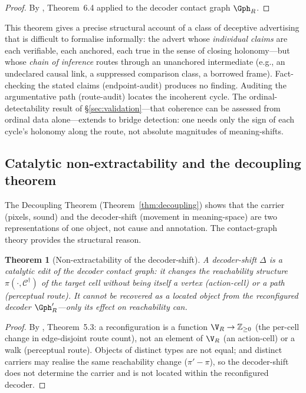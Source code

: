 \documentclass[twocolumn,11pt,a4paper]{article}
\theoremstyle{adv}
\newtheorem{theorem}{Theorem}[section]
\theoremstyle{definition}
\theoremstyle{remark}
\newcommand{\Cell}{\mathcal{C}}        %
\newcommand{\Recv}{R}                  %
\newcommand{\shift}{\Delta}            %
\begin{document}
\begin{proof}
By \citet{sachikonye2025knowledge}, Theorem~6.4 applied to the decoder contact
graph $\Gph_\Recv$.
\end{proof}

This theorem gives a precise structural account of a class of deceptive
advertising that is difficult to formalise informally: the advert whose
\emph{individual claims} are each verifiable, each anchored, each true in the
sense of closing holonomy---but whose \emph{chain of inference} routes through
an unanchored intermediate (e.g., an undeclared causal link, a suppressed
comparison class, a borrowed frame). Fact-checking the stated claims
(endpoint-audit) produces no finding. Auditing the argumentative path
(route-audit) locates the incoherent cycle. The ordinal-detectability result of
\S\ref{sec:validation}---that coherence can be assessed from ordinal data
alone---extends to bridge detection: one needs only the sign of each cycle's
holonomy along the route, not absolute magnitudes of meaning-shifts.

\subsection{Catalytic non-extractability and the decoupling theorem}

The Decoupling Theorem (Theorem~\ref{thm:decoupling}) shows that the carrier
(pixels, sound) and the decoder-shift (movement in meaning-space) are two
representations of one object, not cause and annotation. The contact-graph
theory provides the structural reason.

\begin{theorem}[Non-extractability of the decoder-shift]
\label{thm:non-extract}
A decoder-shift $\shift$ is a catalytic edit of the decoder contact graph: it
changes the reachability structure $\pi(\cdot,\Cell^\dagger)$ of the target cell
without being itself a vertex (action-cell) or a path (perceptual route). It
cannot be recovered as a located object from the reconfigured decoder
$\Gph'_\Recv$---only its effect on reachability can.
\end{theorem}

\begin{proof}
By \citet{sachikonye2025knowledge}, Theorem~5.3: a reconfiguration is a
function $\V_\Recv\to\mathbb{Z}_{\ge0}$ (the per-cell change in edge-disjoint
route count), not an element of $\V_\Recv$ (an action-cell) or a walk
(perceptual route). Objects of distinct types are not equal; and distinct
carriers may realise the same reachability change ($\pi'-\pi$), so the
decoder-shift does not determine the carrier and is not located within the
reconfigured decoder.
\end{proof}
\end{document}
